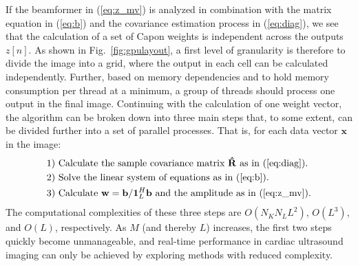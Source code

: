 \documentclass[journal]{IEEEtran}
\newcommand{\mat}[1]{\mathbf{#1}}
\renewcommand{\vec}[1]{\mathbf{#1}}
\begin{document}
If the beamformer in (\ref{eq:z_mv}) is analyzed in combination with the matrix equation in (\ref{eq:b}) and the covariance estimation process in (\ref{eq:diag}), we see that the calculation of a set of Capon weights is independent across the outputs $z[n]$. As shown in Fig.\ \ref{fig:gpulayout}, a first level of granularity is therefore to divide the image into a grid, where the output in each cell can be calculated independently. Further, based on memory dependencies and to hold memory consumption per thread at a minimum, a group of threads should process one output in the final image. Continuing with the calculation of one weight vector, the algorithm can be broken down into three main steps that, to some extent, can be divided further into a set of parallel processes. That is, for each data vector $\vec{x}$ in the image:
\begin{align*}
\text{1) } &\text{Calculate the sample covariance matrix } \mat{\hat{R}} \text{ as in } \text{(\ref{eq:diag})}.\\
\text{2) } &\text{Solve the linear system of equations as in (\ref{eq:b}}).\\ %
\text{3) } &\text{Calculate } \vec{w} = \vec{b}/\vec{1}_{L}^H\vec{b} \text{ and the amplitude as in (\ref{eq:z_mv})}.
\end{align*}
The computational complexities of these three steps are $O(N_KN_LL^2)$, $O(L^3)$, and $O(L)$, respectively. As $M$ (and thereby $L$) increases, the first two steps quickly become unmanageable, and real-time performance in cardiac ultrasound imaging can only be achieved by exploring methods with reduced complexity.
\end{document}
